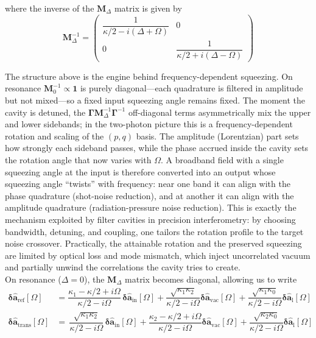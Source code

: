 where the inverse of the $\mathbf{M}_\Delta$ matrix is given by 
\begin{equation}
\mathbf{M}_\Delta^{-1} =
\begin{pmatrix}
\dfrac{1}{\kappa/2 - i(\Delta + \Omega)} & 0 \\
0 & \dfrac{1}{\kappa/2 + i(\Delta - \Omega)}
\end{pmatrix}
\end{equation}

The structure above is the engine behind frequency-dependent squeezing. On resonance $\mathbf{M}^{-1}_0 \propto \mathbf{1}$ is purely diagonal—each quadrature is filtered in amplitude but not mixed—so a fixed input squeezing angle remains fixed. The moment the cavity is detuned, the $\mathbf{\Gamma}\mathbf{M}^{-1}_\Delta \mathbf{\Gamma}^{-1}$ off-diagonal terms asymmetrically mix the upper and lower sidebands; in the two-photon picture this is a frequency-dependent rotation and scaling of the $(p,q)$ basis. The amplitude (Lorentzian) part sets how strongly each sideband passes, while the phase accrued inside the cavity sets the rotation angle that now varies with $\Omega$. A broadband field with a single squeezing angle at the input is therefore converted into an output whose squeezing angle “twists” with frequency: near one band it can align with the phase quadrature (shot-noise reduction), and at another it can align with the amplitude quadrature (radiation-pressure noise reduction). This is exactly the mechanism exploited by filter cavities in precision interferometry: by choosing bandwidth, detuning, and coupling, one tailors the rotation profile to the target noise crossover. Practically, the attainable rotation and the preserved squeezing are limited by optical loss and mode mismatch, which inject uncorrelated vacuum and partially unwind the correlations the cavity tries to create. \\


On resonance ($\Delta=0$), the $\mathbf{M}_\Delta$ matrix becomes diagonal, allowing us to write 
\begin{equation}
  \begin{split}
  \mathbf{\delta \hat{a}_{\mathrm{ref}}}[\Omega]   &= \dfrac{\kappa_1-\kappa/2+i\Omega}{\kappa/2-i\Omega}  \,  \mathbf{\delta \hat{a}_{\mathrm{in}}}[\Omega]   +   \dfrac{\sqrt{\kappa_1 \kappa_2} }{\kappa/2-i\Omega}  \mathbf{\delta \hat{a}_{\mathrm{vac}}}[\Omega] + \dfrac{\sqrt{\kappa_1 \kappa_0} }{\kappa/2-i\Omega}  \mathbf{\delta \hat{a}_{\mathrm{l}}}[\Omega]  \\
  \mathbf{\delta \hat{a}_{\mathrm{trans}}}[\Omega]   &= \, \dfrac{ \sqrt{\kappa_1 \kappa_2}}{\kappa/2-i\Omega}  \, \mathbf{\delta \hat{a}_{\mathrm{in}}}[\Omega]   +  \dfrac{\kappa_2-\kappa/2+i\Omega}{\kappa/2-i\Omega}   \mathbf{\delta \hat{a}_{\mathrm{vac}}}[\Omega]   + \dfrac{\sqrt{\kappa_2 \kappa_0} }{\kappa/2-i\Omega}  \mathbf{\delta \hat{a}_{\mathrm{l}}}[\Omega] 
  \end{split}
\end{equation}

